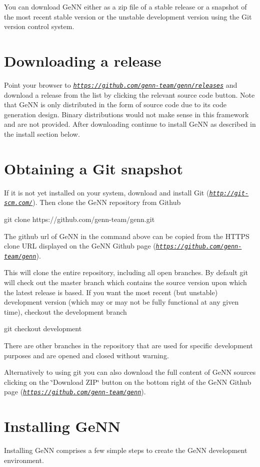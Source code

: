 You can download Ge\+N\+N either as a zip file of a stable release or a snapshot of the most recent stable version or the unstable development version using the Git version control system.\hypertarget{Installation_Downloading}{}\section{Downloading a release}\label{Installation_Downloading}
Point your browser to {\itshape \href{https://github.com/genn-team/genn/releases}{\tt https\+://github.\+com/genn-\/team/genn/releases}} and download a release from the list by clicking the relevant source code button. Note that Ge\+N\+N is only distributed in the form of source code due to its code generation design. Binary distributions would not make sense in this framework and are not provided. After downloading continue to install Ge\+N\+N as described in the install section below.\hypertarget{Installation_GitSnapshot}{}\section{Obtaining a Git snapshot}\label{Installation_GitSnapshot}
If it is not yet installed on your system, download and install Git ({\itshape \href{http://git-scm.com/}{\tt http\+://git-\/scm.\+com/}}). Then clone the Ge\+N\+N repository from Github 
\begin{DoxyCode}
git clone https:\textcolor{comment}{//github.com/genn-team/genn.git}
\end{DoxyCode}
 The github url of Ge\+N\+N in the command above can be copied from the H\+T\+T\+P\+S clone U\+R\+L displayed on the Ge\+N\+N Github page ({\itshape \href{https://github.com/genn-team/genn}{\tt https\+://github.\+com/genn-\/team/genn}}).

This will clone the entire repository, including all open branches. By default git will check out the master branch which contains the source version upon which the latest release is based. If you want the most recent (but unstable) development version (which may or may not be fully functional at any given time), checkout the development branch 
\begin{DoxyCode}
git checkout development
\end{DoxyCode}
 There are other branches in the repository that are used for specific development purposes and are opened and closed without warning.

Alternatively to using git you can also download the full content of Ge\+N\+N sources clicking on the \char`\"{}\+Download Z\+I\+P\char`\"{} button on the bottom right of the Ge\+N\+N Github page ({\itshape \href{https://github.com/genn-team/genn}{\tt https\+://github.\+com/genn-\/team/genn}}).\hypertarget{Installation_installing}{}\section{Installing Ge\+N\+N}\label{Installation_installing}
Installing Ge\+N\+N comprises a few simple steps to create the Ge\+N\+N development environment.

